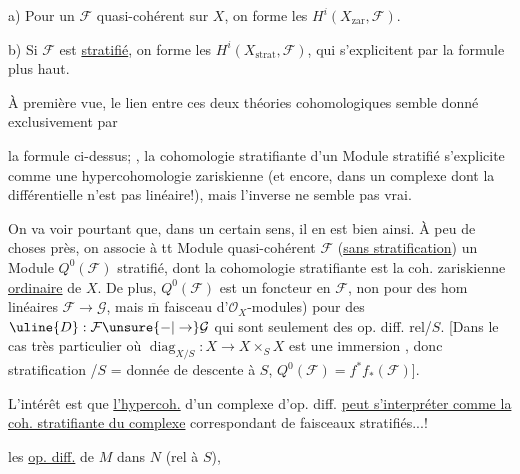a) Pour un $\mathcal{F}$ quasi-cohérent sur $X$, on forme les $H^i(X_{\mathrm{zar}},\mathcal{F})$.

b) Si $\mathcal{F}$ est \uline{stratifié}, on forme les $H^i(X_{\mathrm{strat}},\mathcal{F})$, qui s'explicitent par la formule plus haut.

À première vue, le lien entre ces deux théories cohomologiques semble donné exclusivement par


la formule ci-dessus;
, la cohomologie stratifiante d'un Module stratifié s'explicite comme une hypercohomologie zariskienne (et encore, dans un complexe dont la  différentielle n'est pas linéaire!),  mais l'inverse ne semble pas vrai.

On va voir pourtant que, dans un certain sens, il en est bien ainsi.
À peu de choses près, on associe à tt Module quasi-cohérent $\mathcal{F}$ (\uline{sans stratification}) un Module   $Q^0(\mathcal{F})$ stratifié, dont la cohomologie stratifiante est la coh. zariskienne \uline{ordinaire} de $X$.
De plus, $Q^0(\mathcal{F})$ est un foncteur en $\mathcal{F}$, non  pour des hom linéaires $\mathcal{F}\to\mathcal{G}$, mais $\overline{\mathrm m}$   faisceau  d'$\mathcal{O}_X$-modules) pour des $\uline{D}:\mathcal{F}\unsure{\mathbin{-}|\to}\mathcal{G}$ qui sont seulement des op. diff. rel/$S$.
[Dans le cas très particulier où $\operatorname{diag}_{X/S}:X\longrightarrow X\times_S X$ est une immersion , donc  stratification /$S$ = donnée de descente à $S$, $Q^0(\mathcal{F})=f^*f_*(\mathcal{F})$].

L'intérêt  est que \uline{l'hypercoh.}  d'un complexe d'op. diff. \uline{peut s'interpréter comme la coh. stratifiante du complexe} correspondant de faisceaux stratifiés...!


les \uline{op. diff.} de $M$ dans $N$ (rel à $S$),

